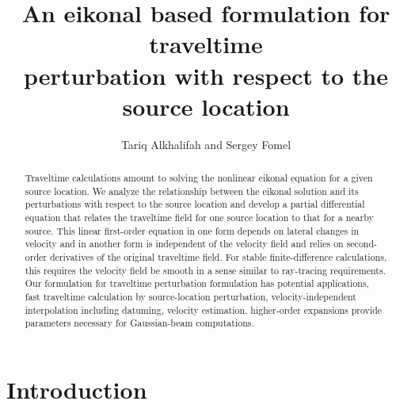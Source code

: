 

\def\bea{\begin{eqnarray}}
\def\eea{  \end{eqnarray}}


\title{An eikonal based formulation for traveltime  \\ perturbation with respect to the source location}


\author{Tariq Alkhalifah and Sergey Fomel}

\maketitle

\begin{abstract}
  Traveltime calculations amount to solving the nonlinear eikonal
  equation for a given source location. We analyze the relationship
  between the eikonal solution and its perturbations with respect to
  the source location and develop a partial differential equation that
  relates the traveltime field for one source location to that for a
  nearby source.  This linear first-order equation in one form depends
  on lateral changes in velocity and in another form is independent of
  the velocity field and relies on second-order derivatives of the
  original traveltime field. For stable finite-difference
  calculations, this requires  the velocity field 
  be smooth in a sense similar to ray-tracing requirements. Our
  formulation for traveltime perturbation formulation has 
   potential applications,   fast traveltime calculation by source-location
  perturbation,  velocity-independent
  interpolation including datuming,  
  velocity estimation.   higher-order
  expansions provide parameters necessary for Gaussian-beam
  computations.
\end{abstract}


\section{Introduction}

